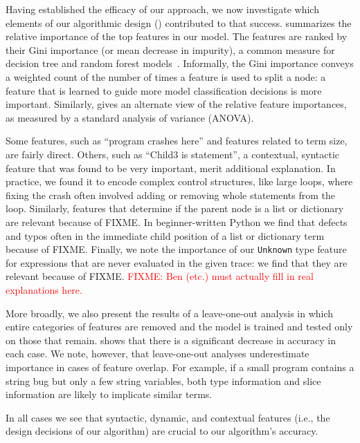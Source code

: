 \documentclass[conference]{IEEEtran}
\newcommand{\fixme}[1]{\textcolor{red}{FIXME: #1}}
\newcommand\lt[1]{{\lstinline|#1|}}
\begin{document}
Having established the efficacy of our approach, we now investigate which
elements of our algorithmic design () contributed to that
success.
 summarizes the relative importance
of the top features in our model. The features are ranked by their
Gini importance (or mean decrease in impurity), a common measure
for decision tree and random forest models~\cite{breiman2001random}. Informally, the
Gini importance conveys a weighted count of the number of times a feature
is used to split a node: a feature that is learned to guide more model
classification decisions is more important. Similarly,  gives
an alternate view of the relative feature importances, as measured by a
standard analysis of variance (ANOVA).

Some features, such as ``program crashes here'' and features
related to term size, are fairly direct. Others, such as ``Child3 is
statement'', a contextual, syntactic feature that was found to be very
important, merit additional explanation. In practice, we found it to
encode complex control structures, like large loops, where fixing the crash
often involved adding or removing whole statements from the loop.
Similarly, features that determine if the parent node
is a list or dictionary are relevant because of FIXME. In beginner-written
Python we find that defects and typos often in the immediate child position
of a list or dictionary term because of FIXME. Finally, we note the
importance of our \lt{Unknown} type feature for expressions that are never
evaluated in the given trace: we find that they are relevant because of
FIXME. \fixme{Ben (etc.) must actually fill in real explanations here.}

More broadly, we also present the results of a leave-one-out analysis in which
entire categories of features are removed and the model is trained
and tested only on those that remain.  shows
that there is a significant decrease in accuracy in each case. We note,
however, that leave-one-out analyses underestimate importance in cases of
feature overlap. For example, if a small program contains a string bug but
only a few string variables, both type information and slice information
are likely to implicate similar terms.

In all cases we see that syntactic, dynamic, and contextual features (i.e.,
the design decisions of our algorithm) are crucial to our algorithm's
accuracy.

\end{document}
